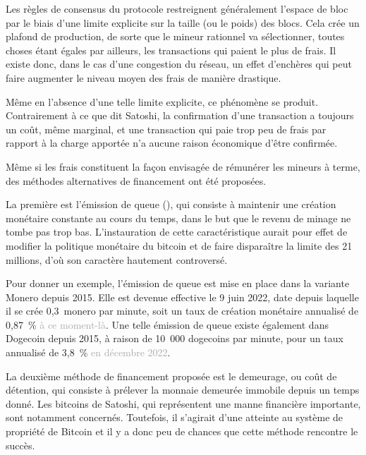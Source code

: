 Les règles de consensus du protocole restreignent généralement l'espace de bloc par le biais d'une limite explicite sur la taille (ou le poids) des blocs. Cela crée un plafond de production, de sorte que le mineur rationnel va sélectionner, toutes choses étant égales par ailleurs, les transactions qui paient le plus de frais. Il existe donc, dans le cas d'une congestion du réseau, un effet d'enchères qui peut faire augmenter le niveau moyen des frais de manière drastique.

Même en l'absence d'une telle limite explicite, ce phénomène se produit. Contrairement à ce que dit Satoshi, la confirmation d'une transaction a toujours un coût, même marginal, et une transaction qui paie trop peu de frais par rapport à la charge apportée n'a aucune raison économique d'être confirmée.


Même si les frais constituent la façon envisagée de rémunérer les mineurs à terme, des méthodes alternatives de financement ont été proposées. 

La première est l'émission de queue (), qui consiste à maintenir une création monétaire constante au cours du temps, dans le but que le revenu de minage ne tombe pas trop bas. L'instauration de cette caractéristique aurait pour effet de modifier la politique monétaire du bitcoin et de faire disparaître la limite des 21 millions, d'où son caractère hautement controversé.

Pour donner un exemple, l'émission de queue est mise en place dans la variante Monero depuis 2015. Elle est devenue effective le 9 juin 2022, date depuis laquelle il se crée 0,3~monero par minute, soit un taux de création monétaire annualisé de 0,87~\% \textcolor{darkgray}{à ce moment-là}. Une telle émission de queue existe également dans Dogecoin depuis 2015, à raison de 10~000 dogecoins par minute, pour un taux annualisé de 3,8~\% \textcolor{darkgray}{en décembre 2022}.

La deuxième méthode de financement proposée est le demeurage, ou coût de détention, qui consiste à prélever la monnaie demeurée immobile depuis un temps donné. Les bitcoins de Satoshi, qui représentent une manne financière importante, sont notamment concernés. Toutefois, il s'agirait d'une atteinte au système de propriété de Bitcoin et il y a donc peu de chances que cette méthode rencontre le succès.

